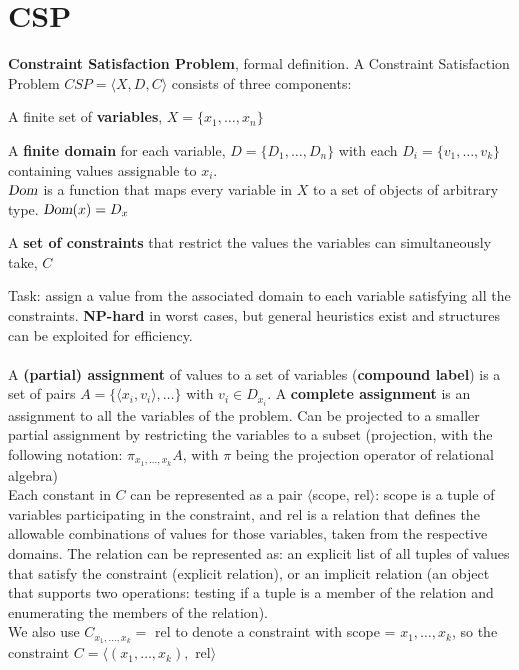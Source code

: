 \documentclass[10pt]{report}
\begin{document}
\section{CSP} \textbf{Constraint Satisfaction Problem}, formal definition.
A Constraint Satisfaction Problem $CSP = \langle X, D, C\rangle$ consists of three components: \begin{list}{}{}
	\item A finite set of \textbf{variables}, $X = \{x_1, \ldots, x_n\}$
	\item A \textbf{finite domain} for each variable, $D = \{D_1, \ldots, D_n\}$ with each $D_i = \{v_1, \ldots, v_k\}$ containing values assignable to $x_i$.\\
	$\textsl{Dom}$ is a function that maps every variable in $X$ to a set of objects of arbitrary type. $\textsl{Dom}(x) = D_x$
	\item A \textbf{set of constraints} that restrict the values the variables can simultaneously take, $C$
\end{list}
Task: assign a value from the associated domain to each variable satisfying all the constraints. \textbf{NP-hard} in worst cases, but general heuristics exist and structures can be exploited for efficiency.\\\\
A \textbf{(partial) assignment} of values to a set of variables (\textbf{compound label}) is a set of pairs $A=\{\langle x_i, v_i\rangle, \ldots\}$ with $v_i \in D_{x_i}$. A \textbf{complete assignment} is an assignment to all the variables of the problem. Can be projected to a smaller partial assignment by restricting the variables to a subset (projection, with the following notation: $\pi_{x_1,\ldots,x_k} A$, with $\pi$ being the projection operator of relational algebra)\\
Each constant in $C$ can be represented as a pair $\langle$scope, rel$\rangle$: scope is a tuple of variables participating in the constraint, and rel is a relation that defines the allowable combinations of values for those variables, taken from the respective domains. The relation can be represented as: an explicit list of all tuples of values that satisfy the constraint (explicit relation), or an implicit relation (an object that supports two operations: testing if a tuple is a member of the relation and enumerating the members of the relation).\\
We also use $C_{x_1,\ldots,x_k} =$ rel to denote a constraint with scope = $x_1,\ldots,x_k$, so the constraint $C=\langle(x_1,\ldots,x_k),$ rel$\rangle$
\end{document}
